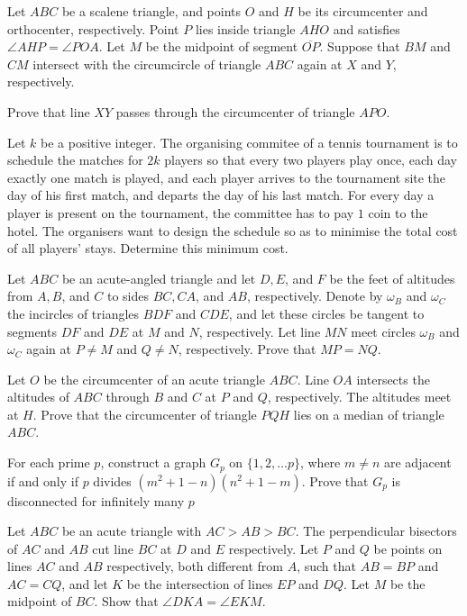 \documentclass[11pt]{scrartcl}
\begin{document}
\begin{problem}[8053761138620448460]
	Let $ABC$ be a scalene triangle, and points $O$ and $H$ be its circumcenter and orthocenter, respectively. Point $P$ lies inside triangle $AHO$ and satisfies $\angle AHP = \angle POA$. Let $M$ be the midpoint of segment $\overline{OP}$. Suppose that $BM$ and $CM$ intersect with the circumcircle of triangle $ABC$ again at $X$ and $Y$, respectively.

Prove that line $XY$ passes through the circumcenter of triangle $APO$.
\end{problem}
\begin{problem}[8916142707013964275]
	Let $k$ be a positive integer. The organising commitee of a tennis tournament is to schedule the matches for $2k$ players so that every two players play once, each day exactly one match is played, and each player arrives to the tournament site the day of his first match, and departs the day of his last match. For every day a player is present on the tournament, the committee has to pay $1$ coin to the hotel. The organisers want to design the schedule so as to minimise the total cost of all players' stays. Determine this minimum cost.
\end{problem}
\begin{problem}[57940096937913]
Let $ABC$ be an acute-angled triangle and let $D, E$, and $F$ be the feet of altitudes from $A, B$, and $C$ to sides $BC, CA$, and $AB$, respectively. Denote by $\omega_B$ and $\omega_C$ the incircles of triangles $BDF$ and $CDE$, and let these circles be tangent to segments $DF$ and $DE$ at $M$ and $N$, respectively. Let line $MN$ meet circles $\omega_B$ and $\omega_C$ again at $P \ne M$ and $Q \ne N$, respectively. Prove that $MP = NQ$.
\end{problem}
\begin{problem}[2139114147569608698]
Let $O$ be the circumcenter of an acute triangle $ABC$. Line $OA$ intersects the altitudes of $ABC$ through $B$ and $C$ at $P$ and $Q$, respectively. The altitudes meet at $H$. Prove that the circumcenter of triangle $PQH$ lies on a median of triangle $ABC$.
\end{problem}
\begin{problem}[409146991986056]
For each prime $p$, construct a graph $G_p$ on $\{1,2,\ldots p\}$, where $m\neq n$ are adjacent if and only if $p$ divides $(m^{2} + 1-n)(n^{2} + 1-m)$. Prove that $G_p$ is disconnected for infinitely many $p$
\end{problem}
\begin{problem}[27464517430039]
	Let $ABC$ be an acute triangle with $AC > AB > BC$. The perpendicular bisectors of $AC$ and $AB$ cut line $BC$ at $D$ and $E$ respectively. Let $P$ and $Q$ be points on lines $AC$ and $AB$ respectively, both different from $A$, such that $AB = BP$ and $AC = CQ$, and let $K$ be the intersection of lines $EP$ and $DQ$. Let $M$ be the midpoint of $BC$. Show that $\angle DKA = \angle EKM$.
\end{problem}
\end{document}
